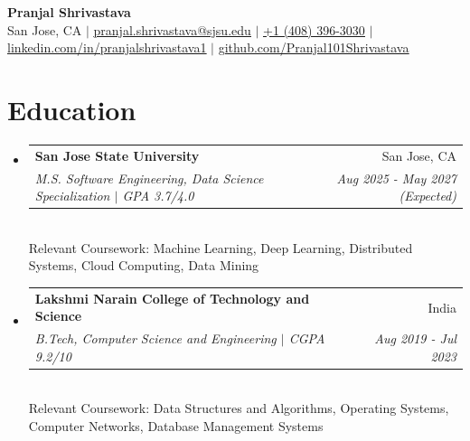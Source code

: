 \documentclass[letterpaper,10.5pt]{article}
\makeatletter
\newcommand{\resumeEduHeading}[5]{
  \vspace{-2pt}\item
    \begin{tabular*}{0.98\textwidth}[t]{l@{\extracolsep{\fill}}r}
      \textbf{#1} & #2 \\
      \textit{\small#3} & \textit{\small #4} \\
    \end{tabular*}\\
    \hspace*{0.15in}\small #5
    \vspace{-5pt}
}
\newcommand{\sqbullet}{\raisebox{0.15ex}{\scriptsize$\blacksquare$}}
\newcommand{\resumeSubHeadingListStart}{\begin{itemize}[leftmargin=0.15in, label=\sqbullet]}
\newcommand{\resumeSubHeadingListEnd}{\end{itemize}}
\makeatother
\begin{document}
\begin{center}
    \textbf{\Huge Pranjal Shrivastava} \\ \vspace{2pt}
    \footnotesize San Jose, CA $|$
    \href{mailto:pranjal.shrivastava@sjsu.edu}{\underline{pranjal.shrivastava@sjsu.edu}} $|$
    \href{tel:+14083963030}{\underline{+1 (408) 396-3030}} $|$
    \href{https://linkedin.com/in/pranjalshrivastava1}{\underline{linkedin.com/in/pranjalshrivastava1}} $|$
    \href{https://github.com/Pranjal101Shrivastava}{\underline{github.com/Pranjal101Shrivastava}}
\end{center}
\vspace{-8pt}

\section{Education}
  \resumeSubHeadingListStart
    \resumeEduHeading
      {San Jose State University}{San Jose, CA}
      {M.S. Software Engineering, Data Science Specialization $|$ GPA 3.7/4.0}{Aug 2025 - May 2027 (Expected)}
      {Relevant Coursework: Machine Learning, Deep Learning, Distributed Systems, Cloud Computing, Data Mining}
    \resumeEduHeading
      {Lakshmi Narain College of Technology and Science}{India}
      {B.Tech, Computer Science and Engineering $|$ CGPA 9.2/10}{Aug 2019 - Jul 2023}
      {Relevant Coursework: Data Structures and Algorithms, Operating Systems, Computer Networks, Database Management Systems}
  \resumeSubHeadingListEnd

\end{document}
